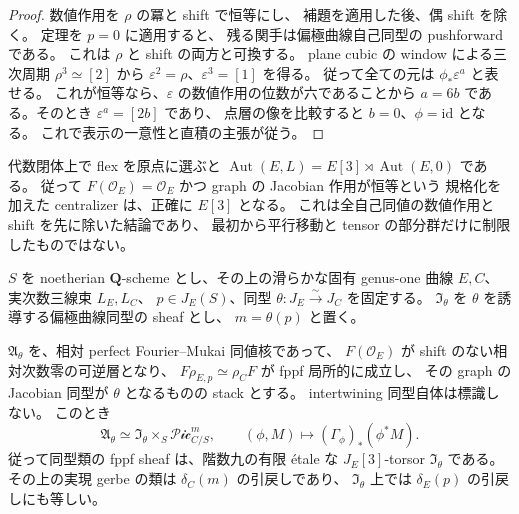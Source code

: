 \begin{proof}
数値作用を $\rho$ の冪と shift で恒等にし、
補題を適用した後、偶 shift を除く。
定理を $p=0$ に適用すると、
残る関手は偏極曲線自己同型の pushforward である。
これは $\rho$ と shift の両方と可換する。
plane cubic の window による三次周期 $\rho^3\simeq[2]$ から
$\varepsilon^2=\rho$、$\varepsilon^3=[1]$ を得る。
従って全ての元は $\phi_*\varepsilon^a$ と表せる。
これが恒等なら、$\varepsilon$ の数値作用の位数が六であることから
$a=6b$ である。そのとき $\varepsilon^a=[2b]$ であり、
点層の像を比較すると $b=0$、$\phi=\mathrm{id}$ となる。
これで表示の一意性と直積の主張が従う。
\end{proof}

代数閉体上で flex を原点に選ぶと
$\operatorname{Aut}(E,L)=E[3]\rtimes\operatorname{Aut}(E,0)$ である。
従って $F(\mathcal O_E)=\mathcal O_E$ かつ graph の Jacobian 作用が恒等という
規格化を加えた centralizer は、正確に $E[3]$ となる。
これは全自己同値の数値作用と shift を先に除いた結論であり、
最初から平行移動と tensor の部分群だけに制限したものではない。

\begin{proposition}
\label{prop:nfm-elliptic-intertwiner-gerbe}
$S$ を noetherian $\mathbf Q$-scheme とし、その上の滑らかな固有
genus-one 曲線 $E,C$、実次数三線束 $L_E,L_C$、
$p\in J_E(S)$、同型 $\theta:J_E\xrightarrow{\sim}J_C$ を固定する。
$\mathfrak I_\theta$ を $\theta$ を誘導する偏極曲線同型の sheaf とし、
$m=\theta(p)$ と置く。

$\mathfrak A_\theta$ を、相対 perfect Fourier--Mukai 同値核であって、
$F(\mathcal O_E)$ が shift のない相対次数零の可逆層となり、
$F\rho_{E,p}\simeq\rho_CF$ が fppf 局所的に成立し、
その graph の Jacobian 同型が $\theta$ となるものの stack とする。
intertwining 同型自体は標識しない。
このとき
\begin{equation}\label{eq:nfm-elliptic-intertwiner-gerbe}
 \mathfrak A_\theta
 \simeq\mathfrak I_\theta\times_S\mathcal{Pic}^{m}_{C/S},
 \qquad
 (\phi,M)\longmapsto(\Gamma_\phi)_*(\phi^*M).
\end{equation}
従って同型類の fppf sheaf は、階数九の有限 \'etale な
$J_E[3]$-torsor $\mathfrak I_\theta$ である。
その上の実現 gerbe の類は $\delta_C(m)$ の引戻しであり、
$\mathfrak I_\theta$ 上では $\delta_E(p)$ の引戻しにも等しい。
\end{proposition}

